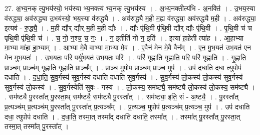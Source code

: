 \documentclass[17pt]{extarticle}
\begin{document}
27. अ॒भ्य॒नक् त्यु॒भय॑स्यो॒ भय॑स्या भ्य॒नक्त्य॑ भ्य॒नक् त्यु॒भय॑स्य । . अ॒भ्य॒नक्तीत्य॑भि - अ॒नक्ति॑ । . उ॒भय॒स्या व॑रुद्ध्या॒ अव॑रुद्ध्या उ॒भय॑स्यो॒ भय॒स्या व॑रुद्ध्यै । . अव॑रुद्ध्यै म॒ही म॒ह्य व॑रुद्ध्या॒ अव॑रुद्ध्यै म॒ही । . अव॑रुद्ध्या॒ इत्यव॑ - रु॒द्ध्यै॒ । . म॒ही द्यौर् द्यौर् म॒ही म॒ही द्यौः । . द्यौः पृ॑थि॒वी पृ॑थि॒वी द्यौर् द्यौः पृ॑थि॒वी । . पृ॒थि॒वी च॑ च पृथि॒वी पृ॑थि॒वी च॑ । . च॒ नो॒ न॒श्च॒ च॒ नः॒ । . न॒ इतीति॑ नो न॒ इति॑ । . इत्या॑ हा॒हेती त्या॑ह । . आ॒हा॒भ्या मा॒भ्या मा॑हा हा॒भ्याम् । . आ॒भ्या मे॒वै वाभ्या मा॒भ्या मे॒व । . ए॒वैन॑ मेन मे॒वै वैन᳚म् । . ए॒न॒ मु॒भ॒यत॑ उभ॒यत॑ एन मेन मुभ॒यतः॑ । . उ॒भ॒यतः॒ परि॒ पर्यु॑भ॒यत॑ उभ॒यतः॒ परि॑ । . परि॑ गृह्णाति गृह्णाति॒ परि॒ परि॑ गृह्णाति । . गृ॒ह्णा॒ति॒ प्राञ्च॒म् प्राञ्च॑म् गृह्णाति गृह्णाति॒ प्राञ्च᳚म् । . प्राञ्च॒ मुपोप॒ प्राञ्च॒म् प्राञ्च॒ मुप॑ । . उप॑ दधाति दधा॒ त्युपोप॑ दधाति । . द॒धा॒ति॒ सु॒व॒र्गस्य॑ सुव॒र्गस्य॑ दधाति दधाति सुव॒र्गस्य॑ । . सु॒व॒र्गस्य॑ लो॒कस्य॑ लो॒कस्य॑ सुव॒र्गस्य॑ सुव॒र्गस्य॑ लो॒कस्य॑ । . सु॒व॒र्गस्येति॑ सुवः - गस्य॑ । . लो॒कस्य॒ सम॑ष्ट्यै॒ सम॑ष्ट्यै लो॒कस्य॑ लो॒कस्य॒ सम॑ष्ट्यै । . सम॑ष्ट्यै पु॒रस्ता᳚त् पु॒रस्ता॒थ् सम॑ष्ट्यै॒ सम॑ष्ट्यै पु॒रस्ता᳚त् । . सम॑ष्ट्या॒ इति॒ सं - अ॒ष्ट्यै॒ । . पु॒रस्ता᳚त् प्र॒त्यञ्च॑म् प्र॒त्यञ्च॑म् पु॒रस्ता᳚त् पु॒रस्ता᳚त् प्र॒त्यञ्च᳚म् । . प्र॒त्यञ्च॒ मुपोप॑ प्र॒त्यञ्च॑म् प्र॒त्यञ्च॒ मुप॑ । . उप॑ दधाति दधा॒ त्युपोप॑ दधाति । . द॒धा॒ति॒ तस्मा॒त् तस्मा᳚द् दधाति दधाति॒ तस्मा᳚त् । . तस्मा᳚त् पु॒रस्ता᳚त् पु॒रस्ता॒त् तस्मा॒त् तस्मा᳚त् पु॒रस्ता᳚त् । \newline
\end{document}
